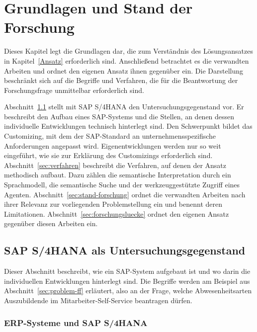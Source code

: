 \chapter{Grundlagen und Stand der Forschung}
\label{StandDerForschung}

Dieses Kapitel legt die Grundlagen dar, die zum Verständnis des Lösungsansatzes in Kapitel~\ref{Ansatz} erforderlich sind. Anschließend betrachtet es die verwandten Arbeiten und ordnet den eigenen Ansatz ihnen gegenüber ein. Die Darstellung beschränkt sich auf die Begriffe und Verfahren, die für die Beantwortung der Forschungsfrage unmittelbar erforderlich sind.

Abschnitt~\ref{sec:system} stellt mit SAP S/4HANA den Untersuchungsgegenstand vor. Er beschreibt den Aufbau eines SAP-Systems und die Stellen, an denen dessen individuelle Entwicklungen technisch hinterlegt sind. Den Schwerpunkt bildet das Customizing, mit dem der SAP-Standard an unternehmensspezifische Anforderungen angepasst wird. Eigenentwicklungen werden nur so weit eingeführt, wie sie zur Erklärung des Customizings erforderlich sind. Abschnitt~\ref{sec:verfahren} beschreibt die Verfahren, auf denen der Ansatz methodisch aufbaut. Dazu zählen die semantische Interpretation durch ein Sprachmodell, die semantische Suche und der werkzeuggestützte Zugriff eines Agenten. Abschnitt~\ref{sec:stand-forschung} ordnet die verwandten Arbeiten nach ihrer Relevanz zur vorliegenden Problemstellung ein und benennt deren Limitationen. Abschnitt~\ref{sec:forschungsluecke} ordnet den eigenen Ansatz gegenüber diesen Arbeiten ein.

\section{SAP S/4HANA als Untersuchungsgegenstand}
\label{sec:system}

Dieser Abschnitt beschreibt, wie ein SAP-System aufgebaut ist und wo darin die individuellen Entwicklungen hinterlegt sind. Die Begriffe werden am Beispiel aus Abschnitt~\ref{sec:problem-ff} erläutert, also an der Frage, welche Abwesenheitsarten Auszubildende im Mitarbeiter-Self-Service beantragen dürfen.

\subsection{ERP-Systeme und SAP S/4HANA}
\label{subsec:erp-s4}

